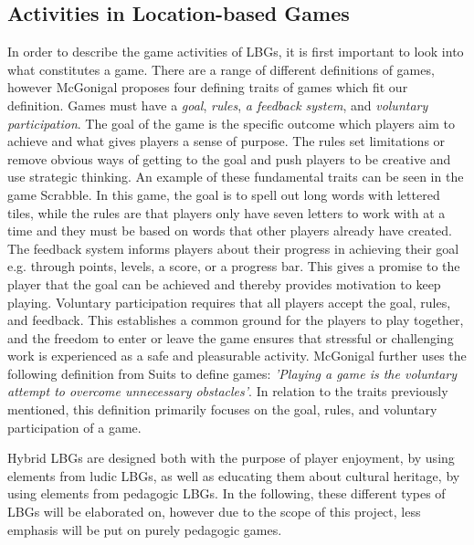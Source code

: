 \subsection{Activities in Location-based Games}
In order to describe the game activities of LBGs, it is first important to look into what constitutes a game. There are a range of different definitions of games, however McGonigal proposes four defining traits of games which fit our definition\cite{RealityIsBroken}. Games must have a \textit{goal}, \textit{rules}, \textit{a feedback system}, and \textit{voluntary participation}. The goal of the game is the specific outcome which players aim to achieve and what gives players a sense of purpose. The rules set limitations or remove obvious ways of getting to the goal and push players to be creative and use strategic thinking. An example of these fundamental traits can be seen in the game Scrabble. In this game, the goal is to spell out long words with lettered tiles, while the rules are that players only have seven letters to work with at a time and they must be based on words that other players already have created. The feedback system informs players about their progress in achieving their goal e.g. through points, levels, a score, or a progress bar. This gives a promise to the player that the goal can be achieved and thereby provides motivation to keep playing. Voluntary participation requires that all players accept the goal, rules, and feedback. This establishes a common ground for the players to play together, and the freedom to enter or leave the game ensures that stressful or challenging work is experienced as a safe and pleasurable activity. McGonigal further uses the following definition from Suits to define games: \emph{'Playing a game is the voluntary attempt to overcome unnecessary obstacles'}\cite{RealityIsBroken}. In relation to the traits previously mentioned, this definition primarily focuses on the goal, rules, and voluntary participation of a game. 

Hybrid LBGs are designed both with the purpose of player enjoyment, by using elements from ludic LBGs, as well as educating them about cultural heritage, by using elements from pedagogic LBGs\cite{LBG_Review}. In the following, these different types of LBGs will be elaborated on, however due to the scope of this project, less emphasis will be put on purely pedagogic games.

